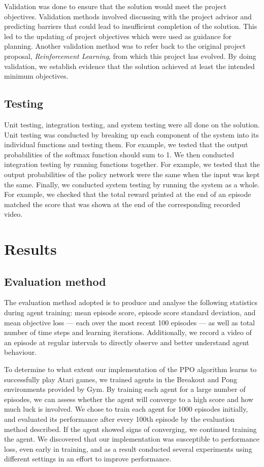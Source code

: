 \documentclass[12pt,a4paper]{article}
\begin{document}
Validation was done to ensure that the solution would meet the project objectives. Validation methods involved discussing with the project advisor and predicting barriers that could lead to insufficient completion of the solution. This led to the updating of project objectives which were used as guidance for planning. Another validation method was to refer back to the original project proposal, \textit{Reinforcement Learning}, from which this project has evolved. By doing validation, we establish evidence that the solution achieved at least the intended minimum objectives.  

\subsection{Testing}
Unit testing, integration testing, and system testing were all done on the solution. Unit testing was conducted by breaking up each component of the system into its individual functions and testing them. For example, we tested that the output probabilities of the softmax function should sum to 1. We then conducted integration testing by running functions together. For example, we tested that the output probabilities of the policy network were the same when the input was kept the same. Finally, we conducted system testing by running the system as a whole. For example, we checked that the total reward printed at the end of an episode matched the score that was shown at the end of the corresponding recorded video.

\section{Results}
\subsection{Evaluation method}
The evaluation method adopted is to produce and analyse the following statistics during agent training: mean episode score, episode score standard deviation, and mean objective loss --- each over the most recent 100 episodes --- as well as total number of time steps and learning iterations. Additionally, we record a video of an episode at regular intervals to directly observe and better understand agent behaviour.

To determine to what extent our implementation of the PPO algorithm learns to successfully play Atari games, we trained agents in the Breakout and Pong environments provided by Gym. By training each agent for a large number of episodes, we can assess whether the agent will converge to a high score and how much luck is involved. We chose to train each agent for 1000 episodes initially, and evaluated its performance after every 100th episode by the evaluation method described. If the agent showed signs of converging, we continued training the agent. We discovered that our implementation was susceptible to performance loss, even early in training, and as a result conducted several experiments using different settings in an effort to improve performance.
\end{document}
